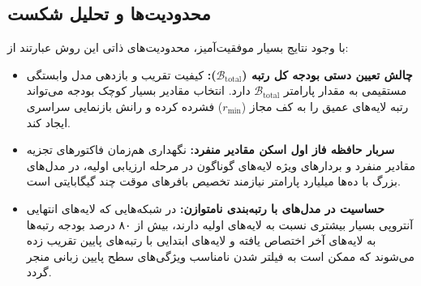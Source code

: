 \subsection{محدودیت‌ها و تحلیل شکست}
با وجود نتایج بسیار موفقیت‌آمیز، محدودیت‌های ذاتی این روش عبارتند از:
\begin{itemize}
    \item \textbf{چالش تعیین دستی بودجه کل رتبه ($\mathcal{B}_{\text{total}}$):} کیفیت تقریب و بازدهی مدل وابستگی مستقیمی به مقدار پارامتر $\mathcal{B}_{\text{total}}$ دارد. انتخاب مقادیر بسیار کوچک بودجه می‌تواند رتبه لایه‌های عمیق را به کف مجاز ($r_{\text{min}}$) فشرده کرده و رانش بازنمایی سراسری ایجاد کند.
    \item \textbf{سربار حافظه فاز اول اسکن مقادیر منفرد:} نگهداری هم‌زمان فاکتورهای تجزیه مقادیر منفرد و بردارهای ویژه لایه‌های گوناگون در مرحله ارزیابی اولیه، در مدل‌های بزرگ با ده‌ها میلیارد پارامتر نیازمند تخصیص بافرهای موقت چند گیگابایتی است.
    \item \textbf{حساسیت در مدل‌های با رتبه‌بندی نامتوازن:} در شبکه‌هایی که لایه‌های انتهایی آنتروپی بسیار بیشتری نسبت به لایه‌های اولیه دارند، بیش از ۸۰ درصد بودجه رتبه‌ها به لایه‌های آخر اختصاص یافته و لایه‌های ابتدایی با رتبه‌های پایین تقریب زده می‌شوند که ممکن است به فیلتر شدن نامناسب ویژگی‌های سطح پایین زبانی منجر گردد.
\end{itemize}
